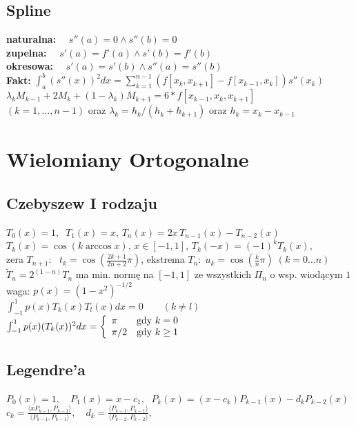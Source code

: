 \documentclass[a4paper,twocolumn]{article}
\begin{document}
\subsection{Spline}
\textbf{naturalna:} $\quad s''(a)=0 \land s''(b)=0$\\
\textbf{zupelna:} $\quad s'(a)=f'(a) \land s'(b)=f'(b)$\\
\textbf{okresowa:} $\quad s'(a)=s'(b) \land s''(a)=s''(b)$\\
\textbf{Fakt:} $\int_a^b \left(s''(x)\right)^2 dx = \sum_{k=1}^{n-1} \left( f\left[x_k,x_{k+1}\right] - f\left[x_{k-1},x_k\right]\right)s''(x_k) $\\
$\lambda_{k}M_{k-1}+2M_{k}+(1-\lambda_{k})M_{k+1}=6*f[x_{k-1},x_{k},x_{k+1}]$\\ $(k=1,...,n-1)$ oraz $\lambda_{k} = h_{k}/(h_{k}+h_{k+1})$ oraz $h_{k}=x_{k} - x_{k-1}$

\section{Wielomiany Ortogonalne}

\subsection{Czebyszew I rodzaju}
$T_0(x) = 1,\;\;T_1(x) = x$, $T_n(x) = 2x\,T_{n-1}(x) - T_{n-2}(x)$\\
$T_{k}(x) = \cos(k\arccos x),\,x\in [-1,1]$, $T_k (-x) = (-1)^k T_k(x)$,\\
zera $T_{n+1}$: \, $t_k=\cos\left(\frac{2k+1}{2n+2}\pi\right)$,
ekstrema $T_{n}:\; u_k = \cos\left(\frac{k}{n}\pi\right)\;(k=0\ldots n)$\\
$\tilde{T}_n = 2^{(1-n)} T_n$ ma min. normę na $[-1,1]$ ze wszystkich $\Pi_{n}$ o wsp. wiodącym $1$ \\
waga: $p(x) = (1-x^2)^{-1/2}$\\
$ \int_{-1}^{1} p(x)T_k(x)T_l(x) dx = 0 \qquad (k \neq l) $\\
$  \int_{-1}^{1} p(x)(T_k(x))^2 dx = \left\{ \begin{array}{ll}
\pi & \textrm{gdy $k=0$}\\
\pi/2 & \textrm{gdy $ k \geq 1 $}
\end{array} \right.$
\subsection{Legendre'a}
$P_0(x) = 1, \quad P_1(x) = x-c_1,\;$
 $   P_k(x) = (x-c_k)P_{k-1}(x) - d_k P_{k-2}(x) $\\
$
    c_k = \frac{\langle x P_{k-1}, P_{k-1} \rangle}{\langle P_{k-1}, P_{k-1} \rangle}, \quad
    d_k = \frac{\langle P_{k-1}, P_{k-1} \rangle}{\langle P_{k-2}, P_{k-2} \rangle},
$
\end{document}
